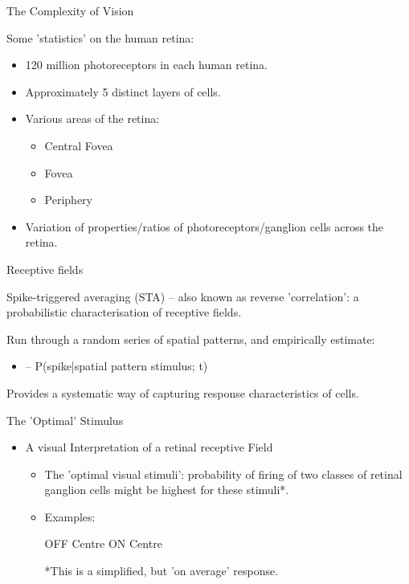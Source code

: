 \documentclass[12pt,t]{beamer}
\begin{document}
\begin{frame}{The Complexity of Vision}

Some 'statistics' on the human retina: 

\begin{itemize}
\item 120 million photoreceptors in each human retina.

\item Approximately 5 distinct layers of cells.

\item Various areas of the retina: 

	\begin{itemize}
	\item Central Fovea
	
	\item Fovea

	\item Periphery 
 
	\end{itemize} 

\item Variation of properties/ratios of photoreceptors/ganglion cells across the retina. 

\end{itemize} 
 
\end{frame}

\begin{frame}[c]{Receptive fields}

Spike-triggered averaging (STA) – also known as reverse 'correlation': a probabilistic characterisation of receptive fields.

 Run through a random series of spatial patterns, and empirically estimate:
	\begin{itemize}
	\item – P(spike|spatial pattern stimulus; t)
	\end{itemize}

Provides a systematic way of capturing response characteristics of cells.

\end{frame}

\begin{frame}[c]{The 'Optimal' Stimulus}

\begin{itemize}

\item A visual Interpretation of a retinal receptive Field

	\begin{itemize}

	\item The 'optimal visual stimuli': probability of firing of two classes of retinal ganglion cells might be highest for these stimuli*.
	\item Examples:
	
OFF Centre
ON Centre

*This is a simplified, but 'on average' response.

	\end{itemize}
\end{itemize}

\end{frame}
\end{document}
